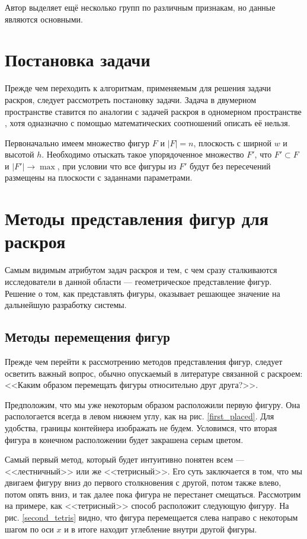 \documentclass[14pt]{extarticle}
\begin{document}
	Автор \cite{Dyckhoff} выделяет ещё несколько групп по различным признакам, но данные являются
	основными.
	\section{Постановка задачи}
	Прежде чем переходить к алгоритмам, применяемым для решения задачи раскроя, следует рассмотреть постановку задачи. Задача в двумерном пространстве ставится по аналогии с задачей раскроя в одномерном пространстве \cite{Nikitenkov}, хотя одназначно с помощью математических соотношений описать её нельзя.
	
	Первоначально имеем множество фигур $F$ и $|F|=n$, плоскость с ширной $w$ и высотой $h$. Необходимо отыскать такое упорядоченное множество $F'$, что $F'\subset F$ и $|F'|\to \max$, при условии что все фигуры из $F'$ будут без пересечений размещены на плоскости с заданнами параметрами. 

	\section{Методы представления фигур для раскроя}
	Самым видимым атрибутом задач раскроя и тем, с чем сразу сталкиваются исследователи в данной области --- геометрическое представление фигур. Решение о том, 	как представлять фигуры, оказывает решающее значение на дальнейшую разработку системы.
	\subsection{Методы перемещения фигур}
	Прежде чем перейти к рассмотрению методов представления фигур, следует осветить важный вопрос, обычно опускаемый в литературе связанной с раскроем: <<Каким 	образом перемещать фигуры относительно друг друга?>>.


	Предположим, что мы уже некоторым образом расположили первую фигуру. Она распологается всегда в левом нижнем углу, как на рис. \ref{first_placed}. Для удобства, границы контейнера изображать не будем. Условимся, что вторая фигура в конечном расположении будет закрашена серым цветом.
	


	Самый первый метод, который будет интуитивно понятен всем — <<лестничный>> или же	<<тетрисный>>. Его суть заключается в том, что мы двигаем фигуру вниз до первого столкновения с другой, потом также влево, потом опять вниз, и так далее пока фигура не перестанет смещаться. Рассмотрим на примере, как <<тетрисный>> способ расположит следующую фигуру. На рис. \ref{second_tetris} видно, что фигура перемещается слева направо с некоторым шагом по оси $x$ и в итоге находит углебление внутри другой фигуры.
	
\end{document}
